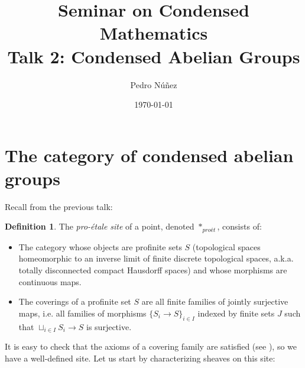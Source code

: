 \documentclass[11pt,A4]{article}
\title{Seminar on Condensed Mathematics \\ \large Talk 2: Condensed Abelian Groups}
\author{Pedro Núñez}
\date{\today}
\theoremstyle{plain}
\theoremstyle{definition}
\newtheorem{defn}[thm]{Definition}
\theoremstyle{remark}
\begin{document}
\maketitle

\tableofcontents

\section{The category of condensed abelian groups}

Recall from the previous talk:

\begin{defn}
    The \textit{pro-étale site} of a point, denoted $*_{proét}$, consists of:
    \begin{itemize}
	\item The category whose objects are profinite sets $S$ (topological spaces homeomorphic to an inverse limit of finite discrete topological spaces, a.k.a. totally disconnected compact Hausdorff spaces) and whose morphisms are continuous maps.
	\item The coverings of a profinite set $S$ are all finite families of jointly surjective maps, i.e. all families of morphisms $\{ S_{i}\to S\}_{i\in I}$ indexed by finite sets $J$ such that $\sqcup_{i\in I}S_{i}\to S$ is surjective.
    \end{itemize}
\end{defn}

It is easy to check that the axioms of a covering family are satisfied (see \cite[\href{https://stacks.math.columbia.edu/tag/00VH}{Tag 00VH}]{sta19}), so we have a well-defined site.
Let us start by characterizing sheaves on this site:
\end{document}
